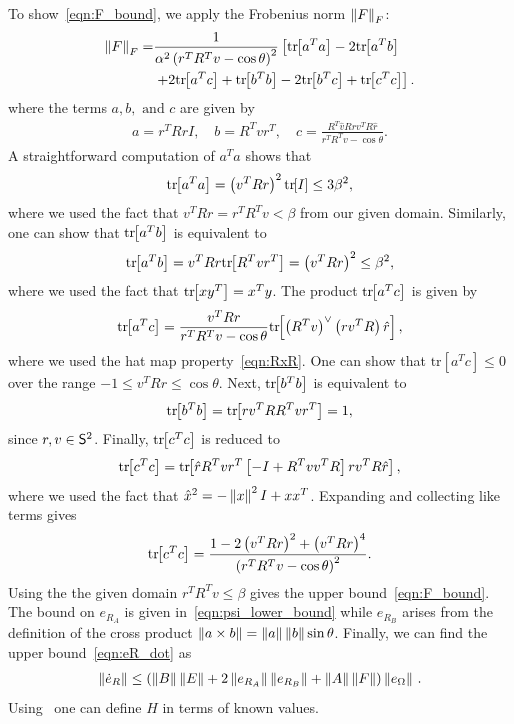 \documentclass[fleqn]{IJCAS}  %
\begin{document}
\begin{multicols}{2}
To show~\cref{eqn:F_bound}, we apply the Frobenius norm \( \left\| F \right\|_F \):
\begin{align*}
	\left\| F \right\|_F =& \frac{1}{\alpha ^2 \left( r^T R^T v - \cos \theta \right)^2} \left[\mathrm{tr}\negthickspace\left[ a^T a \right] - 2 \mathrm{tr}\negthickspace\left[ a^T b \right] \right. \\
	&\left.+ 2 \mathrm{tr}\negthickspace\left[ a^T c  \right] + \mathrm{tr}\negthickspace\left[ b^T b \right]  - 2 \mathrm{tr}\negthickspace\left[ b^T c \right] + \mathrm{tr}\negthickspace\left[ c^T c \right]\right] .
\end{align*}
where the terms \( a, b, \text{ and } c \) are given by
\begin{gather*}
	a = r^T R r I , \quad	b = R^T v r^T , \quad c = \frac{R^T \hat{v} R r v^T R \hat{r}}{r^T R^T v - \cos \theta}.
\end{gather*}
A straightforward computation of \( a^T a \) shows that
\begin{gather*}
	\mathrm{tr}\negthickspace\left[ a^T a \right] = \left( v^T R r \right)^2 \mathrm{tr}\negthickspace\left[ I \right] \leq 3 \beta^2 ,
\end{gather*}
where we used the fact that \( v^T R r = r^T R^T v < \beta \) from our given domain.
Similarly, one can show that \( \mathrm{tr}\negthickspace\left[ a^T b \right] \) is equivalent to
\begin{gather*}
	\mathrm{tr}\negthickspace\left[ a^T b \right] = v^T R r \mathrm{tr}\negthickspace\left[ R^T v r^T \right] = \left( v^T R r \right)^2 \leq \beta^2 ,
\end{gather*} 
where we used the fact that \( \mathrm{tr}\negthickspace\left[ x y^T \right] = x^T y \).
The product \( \mathrm{tr}\negthickspace\left[ a^T c \right] \) is given by
\begin{gather*}
	\mathrm{tr}\negthickspace\left[ a^T c \right] = \frac{v^T R r}{r^T R^T v - \cos \theta} \mathrm{tr}\negthickspace\left[ \left( R^T v \right)^\vee \left( r v^T R \right) \hat{r}  \right] ,
\end{gather*}
where we used the hat map property~\cref{eqn:RxR}.
One can show that \(\mathrm{tr}[a^T c] \leq 0 \) over the range \( -1 \leq v^T R r \leq \cos \theta \). 
Next, \( \mathrm{tr}\negthickspace\left[ b^T b \right]\) is equivalent to
\begin{gather*}
	\mathrm{tr}\negthickspace\left[ b^T b \right] = \mathrm{tr}\negthickspace\left[ r v^T R R^T v r^T \right] = 1 ,
\end{gather*}
since \( r,v \in \mathsf{S}^2\).
Finally, \( \mathrm{tr}\negthickspace\left[ c^T c \right] \) is reduced to
\begin{gather*}
	\mathrm{tr}\negthickspace\left[ c^T c \right] = \mathrm{tr}\negthickspace\left[ \hat{r} R^T v r^T \left[ -I + R^T v v^T R \right] r v^T R \hat{r} \right] ,
\end{gather*}
where we used the fact that \( \hat{x}^2 = - \left\| x \right\|^2 I + x x^T\).
Expanding and collecting like terms gives
\begin{gather*}
	\mathrm{tr}\negthickspace\left[ c^T c  \right] = \frac{1 - 2\left( v^T R r \right)^2 + \left( v^T R r \right)^4}{\left( r^T R^T v - \cos \theta \right)^2} . 
\end{gather*}
Using the the given domain \( r^T R^T v \leq \beta \) gives the upper bound~\cref{eqn:F_bound}.
The bound on \( e_{R_A} \) is given in~\cref{eqn:psi_lower_bound} while \( e_{R_B} \) arises from the definition of the cross product \( \left\| a \times b \right\| = \left\| a \right\| \left\| b \right\| \sin \theta \).
Finally, we can find the upper bound~\cref{eqn:eR_dot} as
\begin{gather*}
	\left\| \dot{e}_R \right\| \leq \left( \left\| B \right\| \left\| E \right\| + 2 \left\| e_{R_A} \right\| \left\| e_{R_B} \right\| + \left\| A \right\|\left\| F \right\| \right) \left\| e_\Omega \right\| \, .
\end{gather*}
Using~ one can define \( H \) in terms of known values.


\end{multicols}
\end{document}
